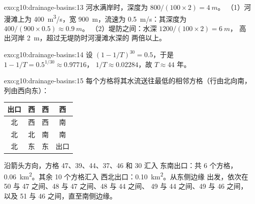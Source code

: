 \begin{solution}{exo:g10:drainage-basins:13}
河水满岸时，深度为 $800/(100 \times 2) = \qty{4}{m}$。
（1）河漫滩上为 \qty{400}{m^3/s}，宽 \qty{900}{m}，流速为
\qty{0.5}{m/s}：其深度为 $400/(900 \times 0.5) \approx \qty{0.9}{m}$。
（2）堤防之间：水深 $1200/(100 \times 2) = \qty{6}{m}$，
高出河岸 \qty{2}{m}，超过无堤防时河漫滩水深的
两倍以上。
\end{solution}

\begin{solution}{exo:g10:drainage-basins:14}
设 $(1 - 1/T)^{30} = 0.5$，于是 $1 - 1/T = 0.5^{1/30} \approx 0.97716$，
$1/T \approx 0.02284$，故 $T \approx 44$ 年。
\end{solution}

\begin{solution}{exo:g10:drainage-basins:15}
每个方格将其水流送往最低的相邻方格（行由北向南，
列由西向东）：
\begin{center}
\begin{tabular}{|c|c|c|c|}
\hline
出口 & 西 & 西 & 西 \\ \hline
北 & 西 & 西 & 南 \\ \hline
北 & 北 & 南 & 南 \\ \hline
北 & 东 & 东 & 出口 \\ \hline
\end{tabular}
\end{center}
沿箭头方向，方格 47、39、44、37、46 和 30 汇入
东南出口：共 6 个方格，\qty{0.06}{km^2}。其余 10 个方格汇入
西北出口：\qty{0.10}{km^2}。从东侧边缘
出发，依次在 50 与 47 之间、48 与 47 之间、48 与 44 之间、
49 与 44 之间、49 与 46 之间，以及 51 与 46 之间，直至南侧边缘。
\end{solution}

